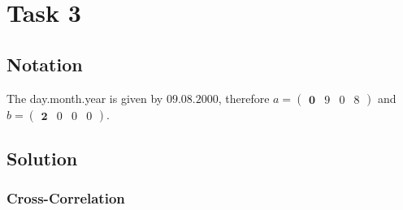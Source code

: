 \documentclass[12pt,a4paper]{article}
\begin{document}
\section{Task 3}

\subsection{Notation}
The day.month.year is given by $09.08.2000$, therefore $a = \begin{pmatrix} \boldsymbol{0} & 9 & 0 & 8 \end{pmatrix}$ and $b = \begin{pmatrix} \boldsymbol{2} & 0 & 0 & 0 \end{pmatrix}$.

\subsection{Solution}
    \subsubsection{Cross-Correlation}
    
\end{document}
